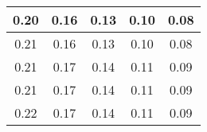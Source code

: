\begin{large}\begin{tabular}{|c|c|c|c|c|}
\hline
0.20&0.16&0.13&0.10&0.08\\\hline
0.21&0.16&0.13&0.10&0.08\\\hline
0.21&0.17&0.14&0.11&0.09\\\hline
0.21&0.17&0.14&0.11&0.09\\\hline
0.22&0.17&0.14&0.11&0.09\\\hline
\end{tabular}
\end{large}